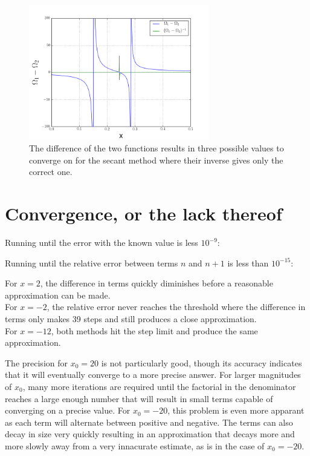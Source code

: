 \documentclass[12pt]{article}
\begin{document}
  \begin{figure}[h]
    \label{fig:omega}
    \centering
    \includegraphics[width=0.7\textwidth]{Problem6a.png}
    \caption{The difference of the two functions results in three possible
    values to converge on for the secant method where their inverse gives
    only the correct one.}
  \end{figure}
  

  \clearpage
  
  \section{Convergence, or the lack thereof}

  

  
  Running until the error with the known value is less $10^{-9}$:
  
  
  Running until the relative error between terms $n$ and $n+1$ is less than $10^{-15}$:
  


  For $x=2$, the difference in terms quickly diminishes before a reasonable
  approximation can be made.
  \\
  For $x=-2$, the relative error never reaches the threshold where the 
  difference in terms only makes 39 steps and still produces a close
  approximation.
  \\
  For $x=-12$, both methods hit the step limit and produce the same approximation.

  
  
  The precision for $x_0=20$ is not particularly good, though  its accuracy
  indicates that it will eventually converge to a more precise answer. For larger
  magnitudes of $x_0$, many more iterations are required until the factorial
  in the denominator reaches a large enough number that will result in small
  terms capable of converging on a precise value.
  For $x_0=-20$, this problem is even more apparant as each term will alternate
  between positive and negative. The terms can also decay in size very quickly
  resulting in an approximation that decays more and more slowly away from a
  very innacurate estimate, as is in the case of $x_0=-20$.
\end{document}
